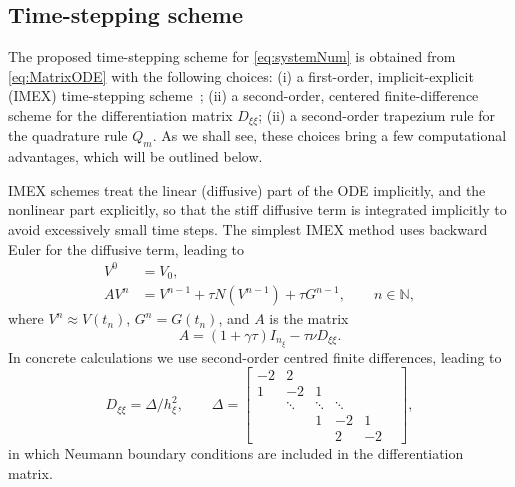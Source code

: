 \documentclass[a4paper,final]{siamart190516}
\newcommand{\Nb}{\mathbb{N}}
\begin{document}
\subsection{Time-stepping scheme} The proposed time-stepping scheme for
\eqref{eq:systemNum} is obtained from \eqref{eq:MatrixODE} with the following
choices: (i) a first-order, implicit-explicit (IMEX) time-stepping
scheme~\cite{ascher1995}; (ii) a second-order, centered finite-difference
scheme for the differentiation matrix $D_{\xi \xi}$; (ii) a second-order trapezium
rule for the quadrature rule $Q_m$. As we shall see, these choices bring
a few computational advantages, which will be outlined below. 

IMEX schemes treat the linear (diffusive) part of the ODE implicitly, and the
nonlinear part explicitly, so that the stiff diffusive term is integrated implicitly
to avoid excessively small time steps. The simplest IMEX method uses backward Euler
for the diffusive term, leading to
\begin{equation}\label{eq:IMEX}
  \begin{aligned}
       V^0 & = V_0, \\
       A V^n & = V^{n-1} + \tau N(V^{n-1}) + \tau G^{n-1}, \qquad n \in \Nb,
  \end{aligned}
\end{equation}
where $V^n \approx V(t_n)$, $G^n = G(t_n)$, and $A$ is the matrix
\begin{equation}\label{eq:AMatr}
  A = (1+\gamma \tau) I_{n_\xi} - \tau \nu D_{\xi \xi}.
\end{equation}
In concrete calculations we use second-order centred finite differences, leading to
\begin{equation}\label{eq:FinDiffLapl}
  D_{\xi \xi} = 
   \Delta/h_\xi^{2}, \qquad \Delta = 
  \begin{bmatrix}
    -2 &  2     &         &        &    &     \\
     1 & -2     &       1 &        &    &     \\
       & \ddots & \ddots & \ddots  &    &     \\
       &        &      1 &      -2 & 1  &     \\
       &        &        &       2 & -2 &  
   \end{bmatrix},
 \end{equation}
in which Neumann boundary conditions are included in the differentiation matrix. 
\end{document}
